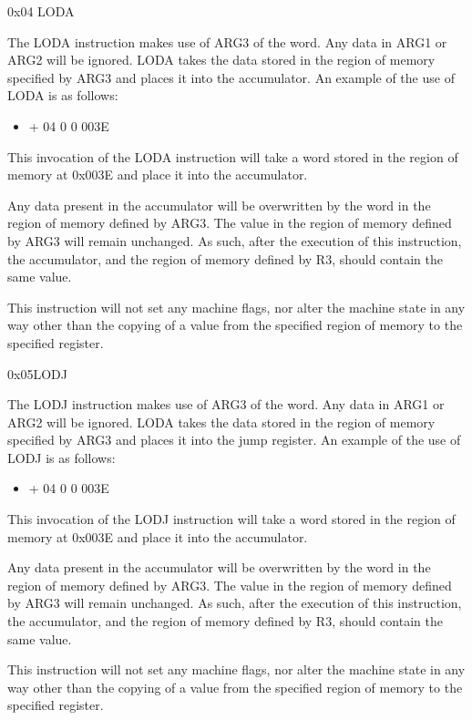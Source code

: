 \documentclass[]{article}
\providecommand{\tightlist}{%
  \setlength{\itemsep}{0pt}\setlength{\parskip}{0pt}}
\begin{document}
0x04 LODA

The LODA instruction makes use of ARG3 of the word. Any data in ARG1 or
ARG2 will be ignored. LODA takes the data stored in the region of memory
specified by ARG3 and places it into the accumulator. An example of the
use of LODA is as follows:

\begin{itemize}
\tightlist
\item
  + 04 0 0 003E
\end{itemize}

This invocation of the LODA instruction will take a word stored in the
region of memory at 0x003E and place it into the accumulator.

Any data present in the accumulator will be overwritten by the word in
the region of memory defined by ARG3. The value in the region of memory
defined by ARG3 will remain unchanged. As such, after the execution of
this instruction, the accumulator, and the region of memory defined by
R3, should contain the same value.

This instruction will not set any machine flags, nor alter the machine
state in any way other than the copying of a value from the specified
region of memory to the specified register.

0x05LODJ

The LODJ instruction makes use of ARG3 of the word. Any data in ARG1 or
ARG2 will be ignored. LODA takes the data stored in the region of memory
specified by ARG3 and places it into the jump register. An example of
the use of LODJ is as follows:

\begin{itemize}
\tightlist
\item
  + 04 0 0 003E
\end{itemize}

This invocation of the LODJ instruction will take a word stored in the
region of memory at 0x003E and place it into the accumulator.

Any data present in the accumulator will be overwritten by the word in
the region of memory defined by ARG3. The value in the region of memory
defined by ARG3 will remain unchanged. As such, after the execution of
this instruction, the accumulator, and the region of memory defined by
R3, should contain the same value.

This instruction will not set any machine flags, nor alter the machine
state in any way other than the copying of a value from the specified
region of memory to the specified register.
\end{document}
